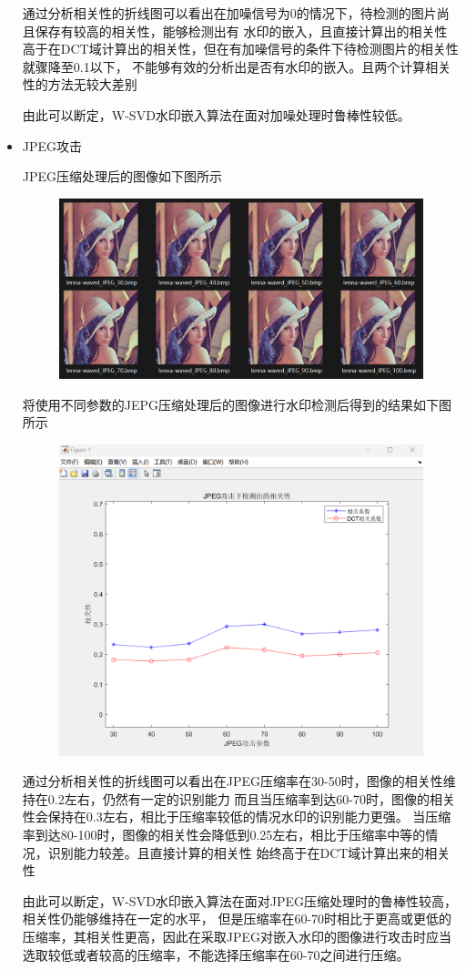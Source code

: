 \documentclass[a4paper,11pt,UTF8]{ctexart}
\newcommand{\bottomcaption}{%
\setlength{\abovecaptionskip}{6pt}%
\setlength{\belowcaptionskip}{6pt}%
\caption}
\newcommand{\xiaowuhao}{\fontsize{9pt}{\baselineskip}\selectfont}   %
\begin{document}
\begin{itemize}
        通过分析相关性的折线图可以看出在加噪信号为0的情况下，待检测的图片尚且保存有较高的相关性，能够检测出有
        水印的嵌入，且直接计算出的相关性高于在DCT域计算出的相关性，但在有加噪信号的条件下待检测图片的相关性就骤降至0.1以下，
        不能够有效的分析出是否有水印的嵌入。且两个计算相关性的方法无较大差别\par
        由此可以断定，W-SVD水印嵌入算法在面对加噪处理时鲁棒性较低。
\newpage
      \item JPEG攻击\par
        JPEG压缩处理后的图像如下图所示
        \begin{figure}[H]
          \centering
          \includegraphics[width=11cm]{imgs_jpeg.png}
          \bottomcaption{\xiaowuhao{JPEG压缩处理后的图像}}
        \end{figure}
        将使用不同参数的JEPG压缩处理后的图像进行水印检测后得到的结果如下图所示
        \begin{figure}[H]
          \centering
          \includegraphics[width=11cm]{attack_jpeg.png}
          \bottomcaption{\xiaowuhao{JPEG压缩处理后的相关性}}
        \end{figure}
        通过分析相关性的折线图可以看出在JPEG压缩率在30-50时，图像的相关性维持在0.2左右，仍然有一定的识别能力
        而且当压缩率到达60-70时，图像的相关性会保持在0.3左右，相比于压缩率较低的情况水印的识别能力更强。
        当压缩率到达80-100时，图像的相关性会降低到0.25左右，相比于压缩率中等的情况，识别能力较差。且直接计算的相关性
        始终高于在DCT域计算出来的相关性\par
        由此可以断定，W-SVD水印嵌入算法在面对JPEG压缩处理时的鲁棒性较高，相关性仍能够维持在一定的水平，
        但是压缩率在60-70时相比于更高或更低的压缩率，其相关性更高，因此在采取JPEG对嵌入水印的图像进行攻击时应当
        选取较低或者较高的压缩率，不能选择压缩率在60-70之间进行压缩。


\end{itemize}
\end{document}
